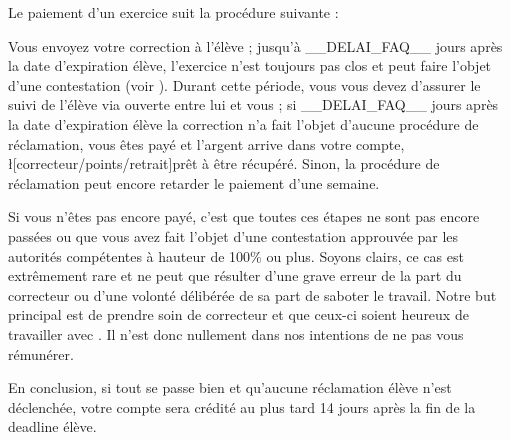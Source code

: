 ﻿Le paiement d'un exercice suit la procédure suivante :

\begin{itemize}
	\li Vous envoyez votre correction à l'élève ;
	\li jusqu'à __DELAI_FAQ__ jours après la date d'expiration élève, l'exercice n'est toujours pas clos et peut faire l'objet d'une contestation (voir ). Durant cette période, vous vous devez d'assurer le suivi de l'élève via  ouverte entre lui et vous ;
	\li si __DELAI_FAQ__ jours après la date d'expiration élève la correction n'a fait l'objet d'aucune procédure de réclamation, vous êtes payé et l'argent arrive dans votre compte, \l[correcteur/points/retrait]{prêt à être récupéré}. Sinon, la procédure de réclamation peut encore retarder le paiement d'une semaine.
\end{itemize}

Si vous n'êtes pas encore payé, c'est que toutes ces étapes ne sont pas encore passées ou que vous avez fait l'objet d'une contestation approuvée par les autorités compétentes à hauteur de 100\% ou plus. Soyons clairs, ce cas est extrêmement rare et ne peut que résulter d'une grave erreur de la part du correcteur ou d'une volonté délibérée de sa part de saboter le travail. Notre but principal est de prendre soin de correcteur et que ceux-ci soient heureux de travailler avec \eDevoir. Il n'est donc nullement dans nos intentions de ne pas vous rémunérer.

En conclusion, si tout se passe bien et qu'aucune réclamation élève n'est déclenchée, votre compte \eDevoir sera crédité au plus tard 14 jours après la fin de la deadline élève.